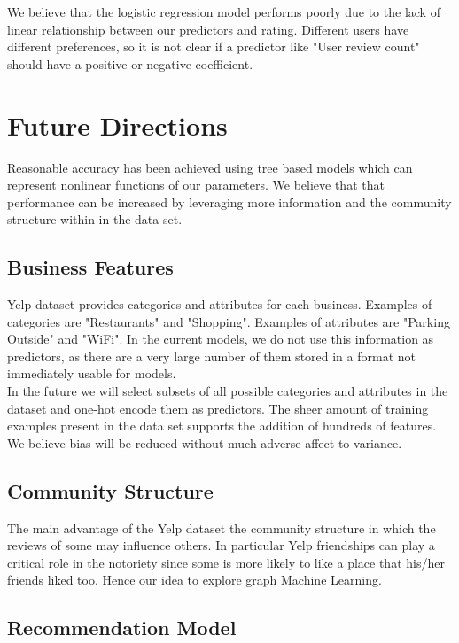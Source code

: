 \documentclass[letterpaper, 11pt]{article}
\begin{document}
We believe that the logistic regression model performs poorly due to the lack of linear relationship between our predictors and rating. Different users have different preferences, so it is not clear if a predictor like "User review count" should have a positive or negative coefficient.

\section{Future Directions}

Reasonable accuracy has been achieved using tree based models which can represent nonlinear functions of our parameters. We believe that that performance can be increased by leveraging more information and the community structure within in the data set.

\subsection{Business Features}

Yelp dataset provides categories and attributes for each business. Examples of categories are "Restaurants" and "Shopping". Examples of attributes are "Parking Outside" and "WiFi". In the current models, we do not use this information as predictors, as there are a very large number of them stored in a format not immediately usable for models. \\

In the future we will select subsets of all possible categories and attributes in the dataset and one-hot encode them as predictors. The sheer amount of training examples present in the data set supports the addition of hundreds of features. We believe bias will be reduced without much adverse affect to variance.

\subsection{Community Structure}

The main advantage of the Yelp dataset the community structure in which the reviews of some may influence others. In particular Yelp friendships can play a critical role in the notoriety since some is more likely to like a place that his/her friends liked too. Hence our idea to explore graph Machine Learning.

\subsection{Recommendation Model}
\end{document}
